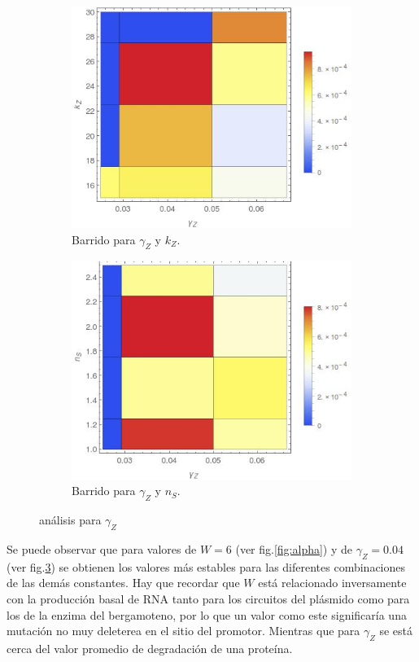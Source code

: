\documentclass[12pt]{article}
\begin{document}
\begin{figure}[H]
  	\begin{subfigure}[b]{0.5\textwidth}
		\centering
		\includegraphics[width=\textwidth]{gammaZ-kZ.jpeg}
		\caption{\label{fig:gammaZ-kZ} Barrido para $\gamma_Z$ y $k_Z$.}
  	\end{subfigure} 	
  		\begin{subfigure}[b]{0.5\textwidth}
		\centering
		\includegraphics[width=\textwidth]{gammaZ-nS.jpeg}
		\caption{\label{fig:gammaZ-nS} Barrido para $\gamma_Z$ y $n_S$.}
  	\end{subfigure} 	
 \caption{\label{fig:gammaZ} an\'alisis para $\gamma _Z$}	
 \end{figure}

Se puede observar que para valores de $W = 6 $ (ver fig.\ref{fig:alpha}) y de $\gamma _Z = 0.04$ (ver fig.\ref{fig:gammaZ}) se obtienen los valores m\'as estables para las diferentes combinaciones de las dem\'as constantes. Hay que recordar que $W$ est\'a relacionado inversamente con la producci\'on basal de RNA tanto para los circuitos del pl\'asmido como para los de la enzima del bergamoteno, por lo que un valor como este significar\'ia una mutaci\'on no muy deleterea en el sitio del promotor. Mientras que para $\gamma _Z$ se est\'a cerca del valor promedio de degradaci\'on de una prote\'ina.



\end{document}
